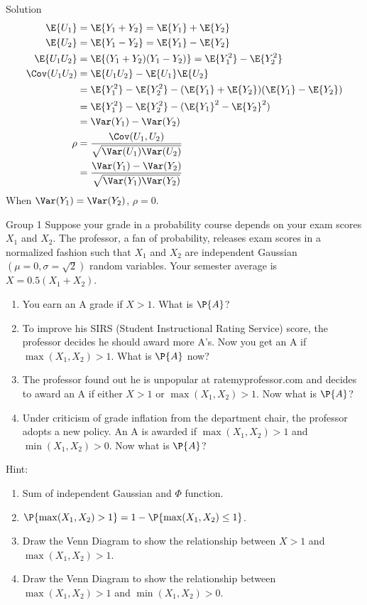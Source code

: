 \documentclass{article}
\theoremstyle{plain}
\theoremstyle{definition}
\theoremstyle{remark}
\begin{document}
\begin{solution}
    {Solution}
    \begin{align*}
        \E{U_1} &= \E{Y_1+Y_2} = \E{Y_1}+\E{Y_2} \\
        \E{U_2} &= \E{Y_1-Y_2} = \E{Y_1}-\E{Y_2} \\
        \E{U_1U_2} &= \E{(Y_1+Y_2)(Y_1-Y_2)} = \E{Y_1^2}-\E{Y_2^2} \\
        \Cov(U_1U_2) &= \E{U_1U_2}-\E{U_1}\E{U_2} \\
        & = \E{Y_1^2}-\E{Y_2^2}-(\E{Y_1}+\E{Y_2})(\E{Y_1}-\E{Y_2}) \\
        &= \E{Y_1^2}-\E{Y_2^2}-(\E{Y_1}^2-\E{Y_2}^2) \\
        &= \Var(Y_1)-\Var(Y_2) \\
        \rho &= \frac{\Cov(U_1,U_2)}{\sqrt{\Var(U_1)\Var(U_2)}} \\
        &= \frac{\Var(Y_1)-\Var(Y_2)}{\sqrt{\Var(Y_1)\Var(Y_2)}}
    \end{align*}
    When $\Var(Y_1)=\Var(Y_2)$, $\rho=0$.
\end{solution}
\begin{problem}
    {Group 1}
    Suppose your grade in a probability course depends on your exam scores $X_1$ and $X_2$. The professor, a fan of probability, releases exam scores in a normalized fashion such that $X_1$ and $X_2$ are independent Gaussian $(\mu = 0, \sigma=\sqrt{2})$ random variables. Your semester average is $X = 0.5(X_1 + X_2)$.
    \begin{enumerate}
        \item You earn an A grade if $X > 1$. What is $\P{A}$?
        \item To improve his SIRS (Student Instructional Rating Service) score, the professor decides he should award more A's. Now you get an A if $\max(X_1,X_2) > 1$. What is $\P{A}$ now?
        \item The professor found out he is unpopular at ratemyprofessor.com and decides to award an A if either $X >1$ or $\max(X_1,X_2) > 1$. Now what is $\P{A}$?
        \item Under criticism of grade inflation from the department chair, the professor adopts a new policy. An A is awarded if $\max(X_1,X_2) > 1$ and $\min(X_1,X_2) > 0$. Now what is $\P{A}$?
    \end{enumerate}
    \begin{solution}
        {Hint:}
        \begin{enumerate}
            \item Sum of independent Gaussian and $\Phi$ function.
            \item $\P{\max(X_1,X_2)>1}=1-\P{\max(X_1,X_2)\leq 1}$.
            \item Draw the Venn Diagram to show the relationship between $X>1$ and $\max(X_1,X_2) > 1$.
            \item Draw the Venn Diagram to show the relationship between $\max(X_1,X_2) > 1$ and $\min(X_1,X_2) > 0$.
        \end{enumerate}
    \end{solution}
\end{problem}
\end{document}
